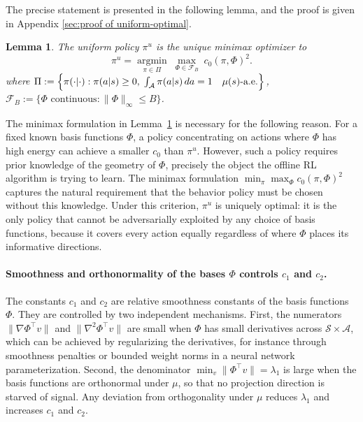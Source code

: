 \documentclass[12pt]{article}
\newtheorem{lemma}[theorem]{Lemma}
\def\lam{\lambda}
\begin{document}
The precise statement is presented in the following lemma, and the proof is given in Appendix \ref{sec:proof of uniform-optimal}.
\begin{lemma}\label{lemma:uniform-optimal}
The uniform policy $\pi^u$ is the unique minimax optimizer to
\begin{equation*}
\pi^u = \operatorname*{argmin}_{\pi \in \Pi}\;
\max_{\Phi \in \mathcal{F}_B}\; c_0(\pi, \Phi)^2.
\end{equation*}
where $\Pi := \Bigl\{\pi(\cdot|\cdot) : \pi(a|s) \geq 0,\;
\int_\mathcal{A}\pi(a|s)\,da = 1 \quad \mu(s)\text{-a.e.}\Bigr\}$, $\mathcal{F}_B := \{\Phi \text{ continuous} : \|\Phi\|_\infty \leq B\}$.    
\end{lemma}

The minimax formulation in Lemma~\ref{lemma:uniform-optimal} is necessary
for the following reason. For a fixed known basis functions $\Phi$, a policy concentrating on actions
where $\Phi$ has high energy can achieve a smaller $c_0$ than $\pi^u$.
However, such a policy requires prior knowledge of the geometry of $\Phi$, precisely the object the offline RL algorithm is trying to learn.
The minimax formulation $\min_{\pi} \max_{\Phi} c_0(\pi, \Phi)^2$ captures
the natural requirement that the behavior policy must be chosen without this
knowledge. Under this criterion, $\pi^u$ is uniquely optimal: it is the only
policy that cannot be adversarially exploited by any choice of basis functions,
because it covers every action equally regardless of where $\Phi$ places its
informative directions.


\paragraph{Smoothness and orthonormality of the bases $\Phi$ controls $c_1$ and $c_2$.}
The constants $c_1$ and $c_2$ are relative smoothness constants of the basis
functions $\Phi$. They are controlled by two independent
mechanisms. First, the numerators $\|\nabla\Phi^\top v\|$ and
$\|\nabla^2\Phi^\top v\|$ are small when $\Phi$ has small derivatives across
$\mathcal{S}\times\mathcal{A}$,  which can be achieved by regularizing the derivatives, for instance through smoothness penalties or bounded weight norms
in a neural network parameterization. Second, the denominator
$\min_v\|\Phi^\top v\| = \lam_1$ is large when the
basis functions are orthonormal under $\mu$, so that no projection direction is starved of signal. Any
deviation from orthogonality under $\mu$ reduces $\lam_1$
and increases $c_1$ and $c_2$.
\end{document}

